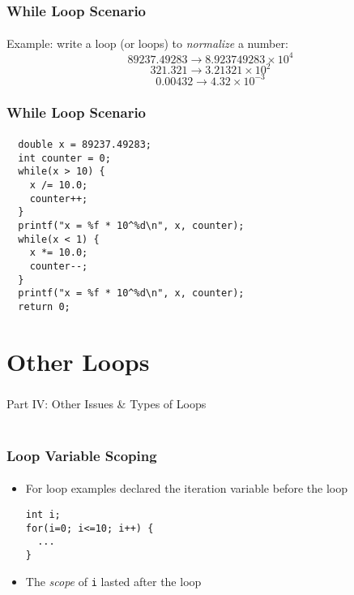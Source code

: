 \documentclass[]{beamer}
\begin{document}
\begin{frame}[fragile]
  \frametitle{While Loop Scenario}
  \framesubtitle{}

Example: write a loop (or loops) to \emph{normalize} a number:
  $$89237.49283 \rightarrow 8.923749283 \times 10^{4}$$
  $$321.321 \rightarrow 3.21321 \times 10^{2}$$
  $$0.00432 \rightarrow 4.32 \times 10^{-3}$$

\end{frame}


\begin{frame}[fragile]
  \frametitle{While Loop Scenario}
  \framesubtitle{}

\begin{verbatim}
  double x = 89237.49283;
  int counter = 0;
  while(x > 10) {
    x /= 10.0;
    counter++;
  }
  printf("x = %f * 10^%d\n", x, counter);
  while(x < 1) {
    x *= 10.0;
    counter--;
  }
  printf("x = %f * 10^%d\n", x, counter);
  return 0;
\end{verbatim}
\end{frame}

\section{Other Loops}

\begin{frame}
    \frametitle{}
    \framesubtitle{}
    
    \begin{center}
    {\Huge Part IV: Other Issues \& Types of Loops}\\
    {\Large ~}
    \end{center}

\end{frame}

\begin{frame}[fragile]
  \frametitle{Loop Variable Scoping}
  \framesubtitle{}

\begin{itemize}[<+->]
  \item For loop examples declared the iteration variable before the loop
\begin{verbatim}
int i;
for(i=0; i<=10; i++) {
  ...
}
\end{verbatim}  
  \item The \emph{scope} of \texttt{i} lasted after the loop
\end{itemize}

\end{frame}
\end{document}
